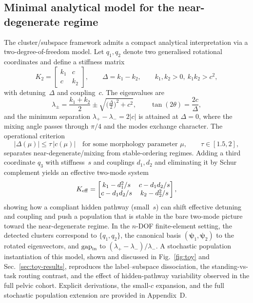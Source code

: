 \documentclass[11pt]{article}
\begin{document}
\subsection{Minimal analytical model for the near-degenerate regime}
\label{sec:toy-methods}

The cluster/subspace framework admits a compact analytical interpretation via a two-degree-of-freedom model.
Let $q_1,q_2$ denote two generalised rotational coordinates and define a stiffness matrix
\begin{equation}
K_2=\begin{bmatrix} k_1 & c\\ c & k_2\end{bmatrix},\qquad \Delta=k_1-k_2,\qquad k_1,k_2>0,\ k_1k_2>c^2,
\end{equation}
with detuning~$\Delta$ and coupling~$c$.
The eigenvalues are
\begin{equation}
\lambda_{\pm}=\frac{k_1+k_2}{2}\pm\sqrt{\Big(\tfrac{\Delta}{2}\Big)^2+c^2},
\qquad
\tan(2\theta)=\frac{2c}{\Delta},
\label{eq:2dof-eig}
\end{equation}
and the minimum separation $\lambda_+-\lambda_-=2|c|$ is attained at $\Delta=0$, where the mixing angle passes through $\pi/4$ and the modes exchange character.
The operational criterion
\begin{equation}
|\Delta(\mu)|\le\tau\,|c(\mu)|\quad\text{for some morphology parameter }\mu,\qquad \tau\in[1.5,2],
\label{eq:2dof-criterion}
\end{equation}
separates near-degenerate/mixing from stable-ordering regimes.
Adding a third coordinate $q_3$ with stiffness~$s$ and couplings $d_1,d_2$ and eliminating it by Schur complement yields an effective two-mode system
\begin{equation}
K_{\rm eff}=\begin{bmatrix} k_1-d_1^2/s & c-d_1d_2/s\\ c-d_1d_2/s & k_2-d_2^2/s\end{bmatrix},
\label{eq:schur}
\end{equation}
showing how a compliant hidden pathway (small~$s$) can shift effective detuning and coupling and push a population that is stable in the bare two-mode picture toward the near-degenerate regime.
In the $n$-DOF finite-element setting, the detected clusters correspond to $\{q_1,q_2\}$, the canonical basis $(\boldsymbol\psi_1,\boldsymbol\psi_2)$ to the rotated eigenvectors, and $\mathrm{gap}_{\rm in}$ to $(\lambda_+-\lambda_-)/\lambda_-$.
A stochastic population instantiation of this model, shown and discussed in Fig.~\ref{fig:toy} and Sec.~\ref{sec:toy-results}, reproduces the label--subspace dissociation, the standing-vs-task routing contrast, and the effect of hidden-pathway variability observed in the full pelvic cohort.
Explicit derivations, the small-$c$ expansion, and the full stochastic population extension are provided in Appendix~D.
\end{document}
